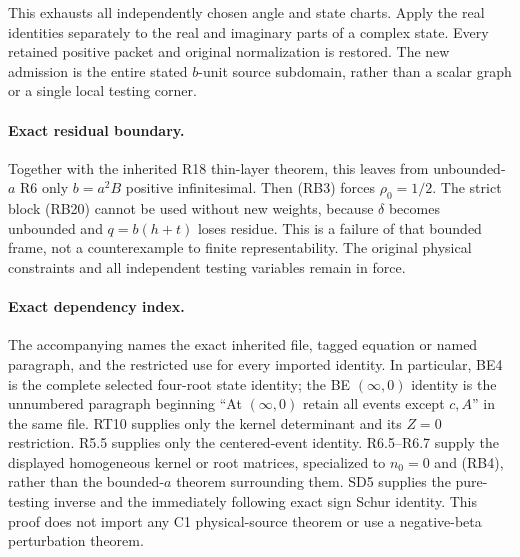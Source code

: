 This exhausts all independently chosen angle and state charts.
Apply the real identities separately to the real and imaginary parts
of a complex state. Every retained positive packet and original
normalization is restored. The new admission is the entire stated
$b$-unit source subdomain, rather than a scalar graph or a single
local testing corner.

\paragraph{Exact residual boundary.}
Together with the inherited R18 thin-layer theorem, this leaves from
unbounded-$a$ R6 only $b=a^2B$ positive infinitesimal. Then (RB3)
forces $\rho_0=1/2$. The strict block (RB20) cannot be used without
new weights, because $\delta$ becomes unbounded and $q=b(h+t)$
loses residue. This is a failure of that bounded frame, not a
counterexample to finite representability. The original physical
constraints and all independent testing variables remain in force.

\paragraph{Exact dependency index.}
The accompanying  names the
exact inherited file, tagged equation or named paragraph, and the
restricted use for every imported identity. In particular, BE4 is the
complete selected four-root state identity; the BE $(\infty,0)$ identity
is the unnumbered paragraph beginning ``At $(\infty,0)$ retain all
events except $c,A$'' in the same file. RT10 supplies only the
kernel determinant and its $Z=0$ restriction. R5.5 supplies only the
centered-event identity. R6.5--R6.7 supply the displayed homogeneous
kernel or root matrices, specialized to $n_0=0$ and (RB4), rather than
the bounded-$a$ theorem surrounding them. SD5 supplies the pure-testing
inverse and the immediately following exact sign Schur identity.
This proof does not import any C1 physical-source theorem or use a
negative-beta perturbation theorem.
